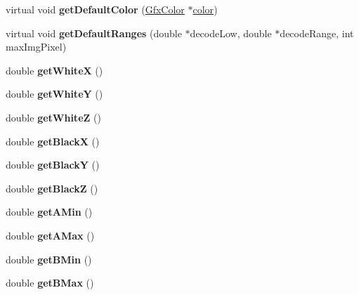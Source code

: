 \begin{DoxyCompactItemize}
virtual void {\bfseries get\+Default\+Color} (\hyperlink{struct_gfx_color}{Gfx\+Color} $\ast$\hyperlink{structcolor}{color})
\item 
\mbox{\label{class_gfx_lab_color_space_a694f15514cf93ce44ba4d1af1ea39526}} 
virtual void {\bfseries get\+Default\+Ranges} (double $\ast$decode\+Low, double $\ast$decode\+Range, int max\+Img\+Pixel)
\item 
\mbox{\label{class_gfx_lab_color_space_a52d75dbe81cdc3070a5d614872f6a833}} 
double {\bfseries get\+WhiteX} ()
\item 
\mbox{\label{class_gfx_lab_color_space_abd41391b125207b326d45e307c8c20e8}} 
double {\bfseries get\+WhiteY} ()
\item 
\mbox{\label{class_gfx_lab_color_space_a9550b5027fef88c15fc93159c4d40256}} 
double {\bfseries get\+WhiteZ} ()
\item 
\mbox{\label{class_gfx_lab_color_space_a38b95a5c3196e313db27962347db9032}} 
double {\bfseries get\+BlackX} ()
\item 
\mbox{\label{class_gfx_lab_color_space_a0d5bce463979083c84ab94da00318263}} 
double {\bfseries get\+BlackY} ()
\item 
\mbox{\label{class_gfx_lab_color_space_a24fed66cc0d03c1766a8de83a3e5d3be}} 
double {\bfseries get\+BlackZ} ()
\item 
\mbox{\label{class_gfx_lab_color_space_a0baaa462d5bc7b062cbbef2a63aea71a}} 
double {\bfseries get\+A\+Min} ()
\item 
\mbox{\label{class_gfx_lab_color_space_af159ec59f485fc670b472e04af37ba77}} 
double {\bfseries get\+A\+Max} ()
\item 
\mbox{\label{class_gfx_lab_color_space_adcd3f8da0d943f7c9c4541eeb477e389}} 
double {\bfseries get\+B\+Min} ()
\item 
\mbox{\label{class_gfx_lab_color_space_affaf6c1602d875462445a0c654a6ae56}} 
double {\bfseries get\+B\+Max} ()
\end{DoxyCompactItemize}
